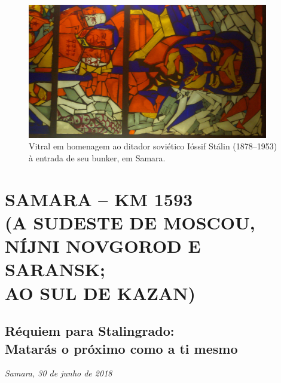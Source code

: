 \movetoevenpage
\begin{absolutelynopagebreak}
\begin{vplace}
\begin{figure}[H]
\begin{adjustwidth}{-2.7cm}{}
  \vspace{-2.8cm}
  \hspace{2.2cm}
  \includegraphics[width=105mm]{./imgs/samara1.jpg}  
\end{adjustwidth}
  \caption{Vitral em homenagem ao ditador soviético Ióssif Stálin (1878--1953) à entrada de seu bunker, em Samara.}

\thispagestyle{empty}

\end{figure}
\end{vplace}

\end{absolutelynopagebreak}


\movetooddpage
{}
\part*{SAMARA -- KM 1593\\(A SUDESTE DE MOSCOU,\\NÍJNI NOVGOROD E SARANSK;\\AO SUL DE KAZAN)}

\chapter*{Réquiem para Stalingrado:\\Matarás o próximo como a ti mesmo}

\begin{flushright}
\emph{Samara, 30 de junho de 2018}
\end{flushright}

